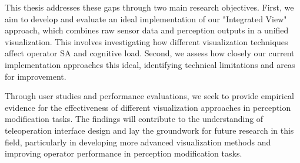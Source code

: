 This thesis addresses these gaps through two main research objectives. First, we aim to develop and evaluate an ideal implementation of our "Integrated View" approach, which combines raw sensor data and perception outputs in a unified visualization. This involves investigating how different visualization techniques affect operator \ac{SA} and cognitive load. Second, we assess how closely our current implementation approaches this ideal, identifying technical limitations and areas for improvement.

Through user studies and performance evaluations, we seek to provide empirical evidence for the effectiveness of different visualization approaches in perception modification tasks. The findings will contribute to the understanding of teleoperation interface design and lay the groundwork for future research in this field, particularly in developing more advanced visualization methods and improving operator performance in perception modification tasks.


